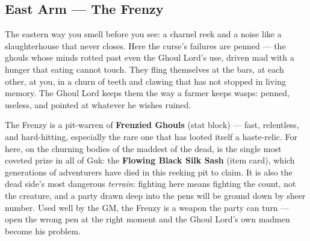 \documentclass[10pt,twoside]{report}
\begin{document}
\subsection*{East Arm --- The Frenzy}
\begin{readaloud}
The eastern way you smell before you see: a charnel reek and a noise like a slaughterhouse that never closes. Here the curse's failures are penned --- the ghouls whose minds rotted past even the Ghoul Lord's use, driven mad with a hunger that eating cannot touch. They fling themselves at the bars, at each other, at you, in a churn of teeth and clawing that has not stopped in living memory. The Ghoul Lord keeps them the way a farmer keeps wasps: penned, useless, and pointed at whatever he wishes ruined.
\end{readaloud}
The Frenzy is a pit-warren of \textbf{Frenzied Ghouls} (stat block) --- fast, relentless, and hard-hitting, especially the rare one that has looted itself a haste-relic. For here, on the churning bodies of the maddest of the dead, is the single most coveted prize in all of Guk: the \textbf{Flowing Black Silk Sash} (item card), which generations of adventurers have died in this reeking pit to claim. It is also the dead side's most dangerous \emph{terrain}: fighting here means fighting the count, not the creature, and a party drawn deep into the pens will be ground down by sheer number. Used well by the GM, the Frenzy is a weapon the party can turn --- open the wrong pen at the right moment and the Ghoul Lord's own madmen become his problem.
\end{document}
